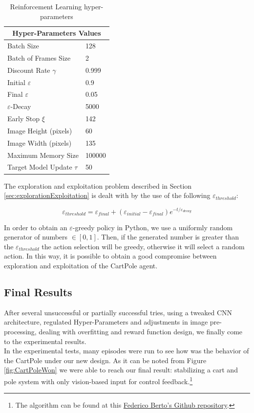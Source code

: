 \begin{table}[h!]
	\centering
	\begin{tabular}{ |p{6cm}|p{6cm}| }
		\hline
		\multicolumn{2}{|c|}{Hyper-Parameters Values} \\
		\hline
		Batch Size & 128 \\
		\hline
		Batch of Frames Size & 2 \\
		\hline
		Discount Rate $\gamma$  & 0.999 \\
		\hline
		Initial $\varepsilon$ & 0.9 \\
		\hline
		Final $\varepsilon$ & 0.05 \\
		\hline
		$\varepsilon$-Decay & 5000 \\
		\hline
		Early Stop $\xi$ & 142 \\
		\hline
		Image Height (pixels) & 60 \\
		\hline
		Image Width (pixels) & 135 \\
		\hline
		Maximum Memory Size  & 100000 \\
		\hline
       	Target Model Update $\tau$ & 50  \\
        \hline

	\end{tabular}
	\label{table:hyperParameters}
	\caption{Reinforcement Learning hyper-parameters}
\end{table}

The exploration and exploitation problem described in Section \ref{sec:explorationExploitation} is dealt with by the use of the following $\varepsilon_{threshold}$:

\begin{equation}
	\varepsilon_{threshold} = \varepsilon_{final} + (\varepsilon_{initial}-\varepsilon_{final})e^{-t/\varepsilon_{decay}}
\end{equation}

In order to obtain an $\varepsilon$-greedy policy in Python, we use a uniformly random generator of numbers $\in[0,1]$. Then, if the generated number is greater than the $\varepsilon_{threshold}$ the action selection will be greedy, otherwise it will select a random action. In this way, it is possible to obtain a good compromise between exploration and exploitation of the CartPole agent.

\subsection{Final Results}

After several unsuccessful or partially successful tries, using a tweaked CNN architecture, regulated Hyper-Parameters and adjustments in image pre-processing, dealing with overfitting and reward function design, we finally come to the experimental results.
\\
\indent In the experimental tests, many episodes were run to see how was the behavior of the CartPole under our new design. As it can be noted from Figure \ref{fig:CartPoleWon} we were able to reach our final result: stabilizing a cart and pole system with only vision-based input for control feedback.\footnote{The algorithm can be found at this \href{https://github.com/fedebberto/Vision_Based_CartPole_DQN}{Federico Berto's Github repository}.}

